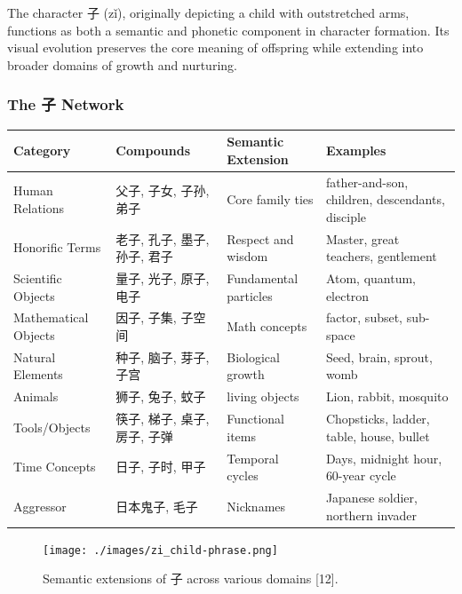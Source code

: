 \documentclass[11pt,letterpaper]{article}
\begin{document}
The character 子 (zǐ), originally depicting a child with outstretched
arms, functions as both a semantic and phonetic component in character
formation. Its visual evolution preserves the core meaning of offspring
while extending into broader domains of growth and nurturing.

\subsubsection{The 子 Network}\label{the-ux5b50-network}


\begin{longtable}{|p{3cm}|p{4cm}|p{4cm}|p{4cm}|}
\hline
\textbf{Category} & \textbf{Compounds} & \textbf{Semantic Extension} & \textbf{Examples} \\
\hline
Human Relations & 父子, 子女, 子孙, 弟子 & Core family ties &
father-and-son, children, descendants, disciple \\
\hline
Honorific Terms & 老子, 孔子, 墨子, 孙子, 君子 & Respect and wisdom &
Master, great teachers, gentlement \\
\hline
Scientific Objects & 量子, 光子, 原子, 电子 & Fundamental particles &
Atom, quantum, electron \\
\hline
Mathematical Objects & 因子, 子集, 子空间 & Math concepts & factor,
subset, sub-space \\
\hline
Natural Elements & 种子, 脑子, 芽子, 子宫 & Biological growth & Seed,
brain, sprout, womb \\
\hline
Animals & 狮子, 兔子, 蚊子 & living objects & Lion, rabbit, mosquito \\
\hline
Tools/Objects & 筷子, 梯子, 桌子, 房子, 子弹 & Functional items &
Chopsticks, ladder, table, house, bullet \\
\hline
Time Concepts & 日子, 子时, 甲子 & Temporal cycles & Days, midnight
hour, 60-year cycle \\
\hline
Aggressor & 日本鬼子, 毛子 & Nicknames & Japanese soldier, northern
invader \\
\hline
\end{longtable}

\begin{figure}
\centering
\texttt{[image: ./images/zi\_child-phrase.png]}
\caption{Semantic extensions of 子 across various domains {[}12{]}.}
\end{figure}
\end{document}
